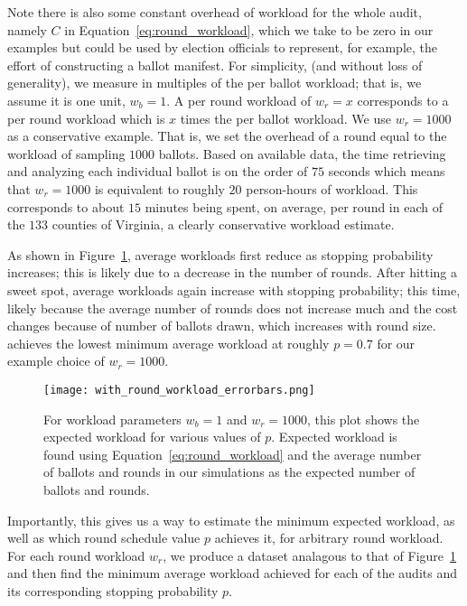 Note there is also some constant overhead of workload for the whole audit, namely $C$ in Equation~\ref{eq:round_workload}, which we take to be zero in our examples but could be used by election officials to represent, for example, the effort of constructing a ballot manifest.
For simplicity, (and without loss of generality), we measure in multiples of the per ballot workload; that is, we assume it is one unit, $w_b=1$. A per round workload of $w_r=x$ corresponds to a per round workload which is $x$ times the per ballot workload. We use $w_r=1000$ as a conservative example. 
That is, we set the overhead of a round equal to the workload of sampling $1000$ ballots. Based on available data\cite{RI-report}, the time retrieving and analyzing each individual ballot is on the order of $75$ seconds which means that $w_r=1000$ is equivalent to roughly $20$ person-hours of workload. This corresponds to about $15$ minutes being spent, on average, per round in each of the $133$ counties of Virginia, a clearly conservative workload estimate. 

As shown in Figure~\ref{fig:with_round_workload}, average workloads first reduce as stopping probability increases; this is likely due to a decrease in the number of rounds. After hitting a sweet spot, average workloads again increase with stopping probability; this time, likely because the average number of rounds does not increase much and the cost changes because of number of ballots drawn, which increases with round size. \Providence achieves the lowest minimum average workload at roughly $p=0.7$ for our example choice of $w_r=1000$.

\begin{figure}[h!]
\texttt{[image: with\_round\_workload\_errorbars.png]}
\caption{For workload parameters $w_b=1$ and $w_r=1000$, this plot shows the expected workload for various values of $p$. Expected workload is found using Equation~\ref{eq:round_workload} and the average number of ballots and rounds in our simulations as the expected number of ballots and rounds.}
\label{fig:with_round_workload}
\end{figure}

Importantly, this gives us a way to estimate the minimum expected workload, as well as which round schedule value $p$ achieves it, for arbitrary round workload. For each round workload $w_r$, we produce a dataset analagous to that of Figure~\ref{fig:with_round_workload} and then find the minimum average workload achieved for each of the audits and its corresponding stopping probability $p$. 

